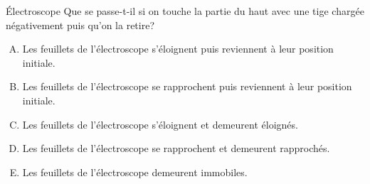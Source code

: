 \documentclass{beamer}
\begin{document}
\begin{frame}{Électroscope}
  Que se passe-t-il si on touche la partie du haut avec une
  tige chargée négativement puis qu'on la retire?

  \begin{enumerate}[A.]
    \item Les feuillets de l'électroscope s'éloignent puis reviennent à leur
      position initiale.
    \item Les feuillets de l'électroscope se rapprochent puis reviennent à leur
      position initiale.
    \item<alert@2> Les feuillets de l'électroscope s'éloignent et demeurent éloignés.
    \item Les feuillets de l'électroscope se rapprochent et demeurent
      rapprochés.
    \item Les feuillets de l'électroscope demeurent immobiles.
  \end{enumerate}
\end{frame}
\end{document}
